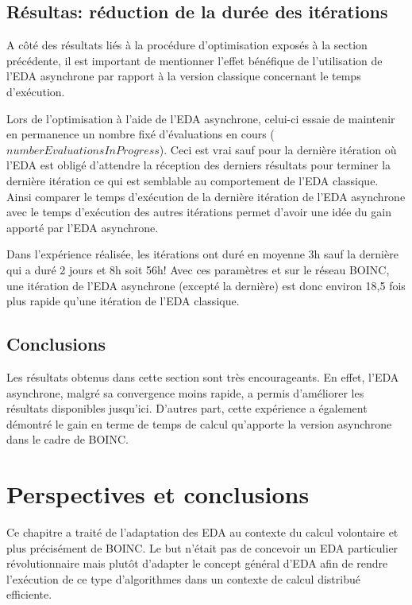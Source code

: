\documentclass[a4paper, 12pt]{report}
\begin{document}
\subsection{Résultas: réduction de la durée des itérations}
A côté des résultats liés à la procédure d'optimisation exposés à la section précédente, il est important de mentionner l'effet bénéfique de l'utilisation de l'EDA asynchrone par rapport à la version classique concernant le temps d'exécution. 

Lors de l'optimisation à l'aide de l'EDA asynchrone, celui-ci essaie de maintenir en permanence un nombre fixé d'évaluations en cours ($numberEvaluationsInProgress$). Ceci est vrai sauf pour la dernière itération où l'EDA est obligé d'attendre la réception des derniers résultats pour terminer la dernière itération ce qui est semblable au comportement de l'EDA classique. Ainsi comparer le temps d'exécution de la dernière itération de l'EDA asynchrone avec le temps d'exécution des autres itérations permet d'avoir une idée du gain apporté par l'EDA asynchrone.

Dans l'expérience réalisée, les itérations ont duré en moyenne 3h sauf la dernière qui a duré 2 jours et 8h soit 56h! Avec ces paramètres et sur le réseau \textsc{BOINC}, une itération de l'EDA asynchrone (excepté la dernière) est donc environ 18,5 fois plus rapide qu'une itération de l'EDA classique. 

\subsection{Conclusions}
Les résultats obtenus dans cette section sont très encourageants. En effet, l'EDA asynchrone, malgré sa convergence moins rapide, a permis d'améliorer les résultats disponibles jusqu'ici. D'autres part, cette expérience a également démontré le gain en terme de temps de calcul qu'apporte la version asynchrone dans le cadre de \textsc{BOINC}.

\section{Perspectives et conclusions}
\label{edaconclu}

Ce chapitre a traité de l'adaptation des EDA au contexte du calcul volontaire et plus précisément de \textsc{BOINC}. Le but n'était pas de concevoir un EDA particulier révolutionnaire mais plutôt d'adapter le concept général d'EDA afin de rendre l'exécution de ce type d'algorithmes dans un contexte de calcul distribué efficiente. 
\end{document}
